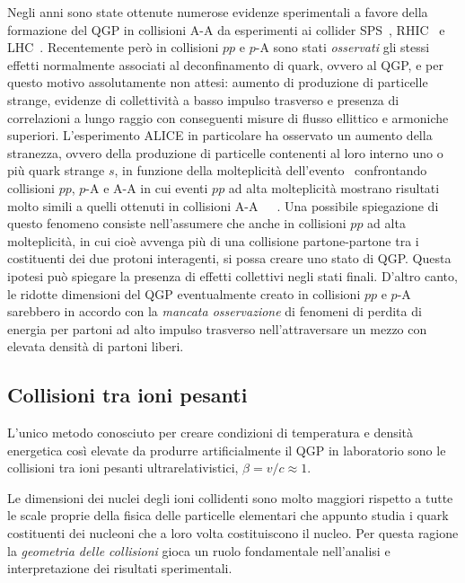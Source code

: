     Negli anni sono state ottenute numerose evidenze sperimentali a favore della formazione del QGP in collisioni A-A da esperimenti ai collider SPS~\cite{NA60_2021}, RHIC~\cite{Gyulassy_2004_RHIC_QGP} e LHC~\cite{ALICE_2024}. Recentemente però in collisioni $pp$ e $p$-A sono stati \textit{osservati} gli stessi effetti normalmente associati al deconfinamento di quark, ovvero al QGP, e per questo motivo assolutamente non attesi: aumento di produzione di particelle strange, evidenze di collettività a basso impulso trasverso e presenza di correlazioni a lungo raggio con conseguenti misure di flusso ellittico e armoniche superiori. L'esperimento ALICE in particolare ha osservato un aumento della stranezza, ovvero della produzione di particelle contenenti al loro interno uno o più quark strange $s$, in funzione della molteplicità dell'evento~\cite{ALICE_2008} confrontando collisioni $pp$, $p$-A e A-A in cui eventi $pp$ ad alta molteplicità mostrano risultati molto simili a quelli ottenuti in collisioni A-A~\cite{RHIC_2020}~\cite{ALICE_2017_pp}~\cite{ALICE_2024_pp_pPb_PbPb}. Una possibile spiegazione di questo fenomeno consiste nell'assumere che anche in collisioni $pp$ ad alta molteplicità, in cui cioè avvenga più di una collisione partone-partone tra i costituenti dei due protoni interagenti, si possa creare uno stato di QGP. Questa ipotesi può spiegare la presenza di effetti collettivi negli stati finali. D'altro canto, le ridotte dimensioni del QGP eventualmente creato in collisioni $pp$ e $p$-A sarebbero in accordo con la \textit{mancata osservazione} di fenomeni di perdita di energia per partoni ad alto impulso trasverso nell'attraversare un mezzo con elevata densità di partoni liberi.

    \subsection{Collisioni tra ioni pesanti}
        L'unico metodo conosciuto per creare condizioni di temperatura e densità energetica così elevate da produrre artificialmente il QGP in laboratorio sono le collisioni tra ioni pesanti ultrarelativistici, $\beta = v/c \approx 1$.

        Le dimensioni dei nuclei degli ioni collidenti sono molto maggiori rispetto a tutte le scale proprie della fisica delle particelle elementari che appunto studia i quark costituenti dei nucleoni che a loro volta costituiscono il nucleo. Per questa ragione la \textit{geometria delle collisioni} gioca un ruolo fondamentale nell'analisi e interpretazione dei risultati sperimentali.

